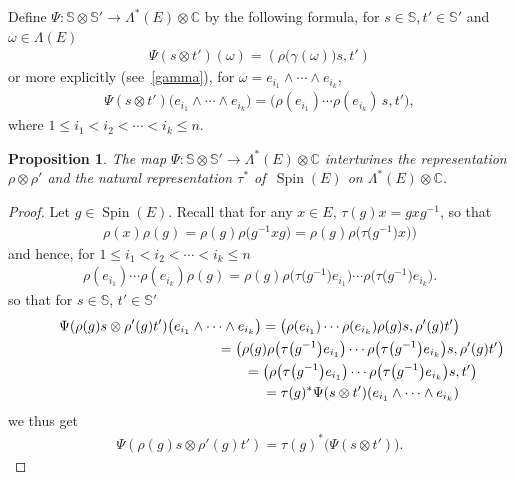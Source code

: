 \documentclass[10pt,a4paper]{amsart}
\DeclareMathOperator{\Spin}{Spin}
\numberwithin{equation}{section}
\newtheorem{prop}[theor]{Proposition}
\begin{document}
Define $\Psi \colon \mathbb S\otimes \mathbb S'\to\Lambda^*(E)\otimes \mathbb C$ by the following formula, for $s\in \mathbb S, t'\in \mathbb S'$ and $\omega\in \Lambda(E)$
\begin{gather*}
\Psi(s\otimes t') (\omega) = (\rho\big(\gamma(\omega)\big)s,t')
\end{gather*}
or more explicitly (see~\eqref{gamma}), for $\omega = e_{i_1}\wedge \cdots \wedge e_{i_k}$,
\begin{gather*}
\Psi(s\otimes t') \big(e_{i_1}\wedge \cdots \wedge e_{i_k} \big) = \big( \rho(e_{i_1}) \cdots \rho(e_{i_k})\, s,t'\big),
\end{gather*}
where $1\leq i_1<i_2<\cdots<i_k\leq n$.
\begin{prop} The map $\Psi \colon \mathbb S \otimes \mathbb S' \to \Lambda^*(E) \otimes \mathbb C$ intertwines the representation $\rho\otimes \rho'$ and the natural representation $\tau^*$ of \,$\Spin(E)$ on $\Lambda^*(E)\otimes \mathbb C$.
\end{prop}
%
\begin{proof}
Let $g\in \Spin(E)$. Recall that for any $x\in E$, $\tau(g) x = gxg^{-1}$, so that
\begin{gather*}
\rho(x) \rho(g) = \rho(g) \rho\big(g^{-1}xg\big) = \rho(g) \rho\big(\tau\big(g^{-1}\big) x)\big)
\end{gather*}
and hence, for $1\leq i_1<i_2<\cdots <i_k\leq n$
\begin{gather*}
\rho(e_{i_1}) \cdots \rho(e_{i_k}) \rho(g) = \rho(g) \rho\big( \tau\big(g^{-1}\big) e_{i_1}\big)\cdots \rho\big( \tau\big(g^{-1}\big) e_{i_k}\big).
\end{gather*}
so that for $s\in \mathbb S$, $t'\in \mathbb S'$
\begin{gather*}
\Psi(\rho(g)s\otimes\rho'(g)t')\big( e_{i_1}\wedge \cdots \wedge e_{i_k}\big) = \big(\rho(e_{i_1}) \cdots \rho(e_{i_k}) \rho(g) s,\rho'(g)t'\big)
\\ \hphantom{\Psi(\rho(g)s\otimes\rho'(g)t')\big( e_{i_1}\wedge \cdots \wedge e_{i_k}\big)}
 {}= \big( \rho(g) \rho\big( \tau\big(g^{-1}\big) e_{i_1}\big)\cdots \rho\big( \tau\big(g^{-1}\big) e_{i_k}\big)s, \rho'(g) t'\big)
 \\ \hphantom{\Psi(\rho(g)s\otimes\rho'(g)t')\big( e_{i_1}\wedge \cdots \wedge e_{i_k}\big)}
{} = \big( \rho\big( \tau\big(g^{-1}\big) e_{i_1}\big)\cdots \rho\big( \tau\big(g^{-1}\big) e_{i_k}\big)s, t'\big)
 \\ \hphantom{\Psi(\rho(g)s\otimes\rho'(g)t')\big( e_{i_1}\wedge \cdots \wedge e_{i_k}\big)}
{} = \tau(g)^*\Psi(s\otimes t') (e_{i_1}\wedge \dots \wedge e_{i_k})
\end{gather*}
we thus get
\begin{gather*}
\Psi(\rho(g)s\otimes \rho'(g)t') = \tau(g)^*\big( \Psi (s\otimes t')\big).
 \tag*{\qed}
\end{gather*}
\renewcommand{\qed}{}
\end{proof}
\end{document}
